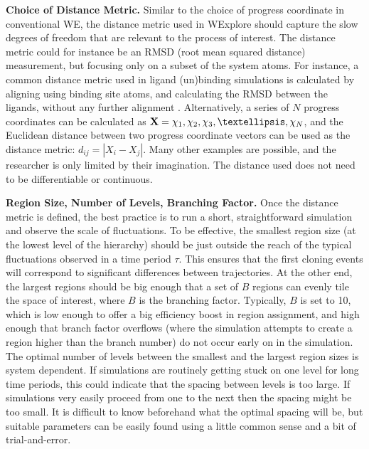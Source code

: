 \documentclass[9pt,tutorial,ASAPversion]{livecoms}
\begin{document}
\textbf{Choice of Distance Metric.} Similar to the choice of progress coordinate in conventional WE, the distance metric used in WExplore should capture the slow degrees of freedom that are relevant to the process of interest. 
The distance metric could for instance be an RMSD (root mean squared distance) measurement, but focusing only on a subset of the system atoms. 
For instance, a common distance metric used in ligand (un)binding simulations is calculated by aligning using binding site atoms, and calculating the RMSD between the ligands, without any further alignment \citep{Dickson2016}. 
Alternatively, a series of $N$ progress coordinates can be calculated as ${\bf X} = {\chi_1, \chi_2, \chi_3, …, \chi_N}$, and the Euclidean distance between two progress coordinate vectors can be used as the distance metric: $d_{ij} = |X_i - X_j|$. 
Many other examples are possible, and the researcher is only limited by their imagination. 
The distance used does not need to be differentiable or continuous.

\textbf{Region Size, Number of Levels, Branching Factor.} Once the distance metric is defined, the best practice is to run a short, straightforward simulation and observe the scale of fluctuations.
To be effective, the smallest region size (at the lowest level of the hierarchy) should be just outside the reach of the typical fluctuations observed in a time period $\tau$. 
This ensures that the first cloning events will correspond to significant differences between trajectories. 
At the other end, the largest regions should be big enough that a set of $B$ regions can evenly tile the space of interest, where $B$ is the branching factor. 
Typically, $B$ is set to 10, which is low enough to offer a big efficiency boost in region assignment, and high enough that branch factor overflows (where the simulation attempts to create a region higher than the branch number) do not occur early on in the simulation. 
The optimal number of levels between the smallest and the largest region sizes is system dependent. 
If simulations are routinely getting stuck on one level for long time periods, this could indicate that the spacing between levels is too large. 
If simulations very easily proceed from one to the next then the spacing might be too small. 
It is difficult to know beforehand what the optimal spacing will be, but suitable parameters can be easily found using a little common sense and a bit of trial-and-error.
\end{document}
